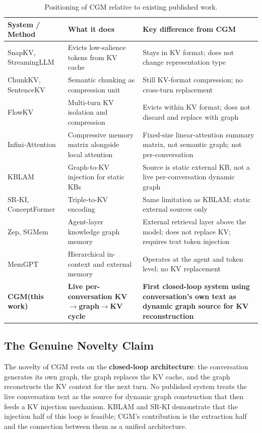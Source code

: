 \documentclass[11pt, a4paper, twoside]{article}
\theoremstyle{definition}
\newcommand{\CGM}{\textsc{CGM}\xspace}
\begin{document}
\begin{table}[H]
\centering
\caption{Positioning of \CGM relative to existing published work.}
\label{tab:novelty}
\renewcommand{\arraystretch}{1.3}
\begin{tabularx}{\textwidth}{@{}lXX@{}}
\toprule
\textbf{System / Method} & \textbf{What it does} & \textbf{Key difference from \CGM} \\
\midrule
SnapKV, StreamingLLM & Evicts low-salience tokens from KV cache & Stays in KV
  format; does not change representation type \\
ChunkKV, SentenceKV & Semantic chunking as compression unit & Still KV-format
  compression; no cross-turn replacement \\
FlowKV & Multi-turn KV isolation and compression & Evicts within KV format;
  does not discard and replace with graph \\
Infini-Attention & Compressive memory matrix alongside local attention & Fixed-size
  linear-attention summary matrix, not semantic graph; not per-conversation \\
KBLAM & Graph-to-KV injection for static KBs & Source is static external KB,
  not a live per-conversation dynamic graph \\
SR-KI, ConceptFormer & Triple-to-KV encoding & Same limitation as KBLAM; static
  external sources only \\
Zep, SGMem & Agent-layer knowledge graph memory & External retrieval layer above
  the model; does not replace KV; requires text token injection \\
MemGPT & Hierarchical in-context and external memory & Operates at the agent and
  token level; no KV replacement \\
\textbf{\CGM (this work)} & \textbf{Live per-conversation KV$\to$graph$\to$KV cycle} &
  \textbf{First closed-loop system using conversation's own text as dynamic graph
  source for KV reconstruction} \\
\bottomrule
\end{tabularx}
\end{table}

\subsection{The Genuine Novelty Claim}

The novelty of \CGM rests on the \textbf{closed-loop architecture}: the conversation
generates its own graph, the graph replaces the KV cache, and the graph reconstructs
the KV context for the next turn. No published system treats the live conversation
text as the source for dynamic graph construction that then feeds a KV injection
mechanism. KBLAM and SR-KI demonstrate that the injection half of this loop
is feasible; \CGM's contribution is the extraction half and the connection between
them as a unified architecture.
\end{document}
